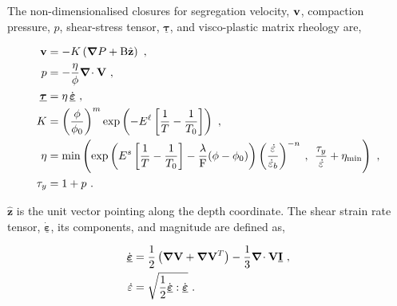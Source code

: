 \documentclass[12pt,a4paper]{article}
\begin{document}
The non-dimensionalised closures for segregation velocity, $\mbox{{\bf v}}$, compaction pressure, $p$, shear-stress tensor, $\underline{\boldsymbol{\tau}}$, and visco-plastic matrix rheology are,
\begin{linenomath*}
\begin{subequations}
\label{eq:nondim-coeffs}
\begin{align}
	\label{eq:nondim-coeffs-segr}
	\mbox{{\bf v}} &= -K \left( \mbox{\boldmath $\nabla$} P + \mathrm{B} \hat{\mathbf{z}} \right) \ , \\
	\label{eq:nondim-coeffs-cpct}
	p &= -\dfrac{\eta}{\phi} \mbox{\boldmath $\nabla$}\!\cdot \mathbf{V} \ , \\
	\label{eq:nondim-coeffs-stress}
	\underline{\boldsymbol{\tau}} &= \eta \, \underline{\dot{\boldsymbol{\varepsilon}}} \ , \\
	\label{eq:nondim-darcy}
	K &= \left(\dfrac{\phi}{\phi_0}\right)^m \exp \left(-E^\ell \left[ \dfrac{1}{T} - \dfrac{1}{T_0} \right] \right) \ , \\
	\label{eq:nondim-coeffs-viscoplast}
	\eta &= \min\left( \exp \left( E^s \left[ \dfrac{1}{T} - \dfrac{1}{T_0} \right] -\dfrac{\lambda} {\mathrm{F}} (\phi-\phi_0) \right) \left(\dfrac{\dot{\varepsilon}}{\dot{\varepsilon}_b} \right)^{-n} \: , \:\: \dfrac{\tau_y}{\dot{\varepsilon}} + \eta_\mathrm{min} \right) \ , \\
	\label{eq:nondim-coeffs-yield}
	\tau_y &= 1 + p \ .
\end{align}
\end{subequations}
\end{linenomath*}
$\hat{\mathbf{z}}$ is the unit vector pointing along the depth coordinate. The shear strain rate tensor, $\underline{\dot{\boldsymbol{\varepsilon}}}$, its components, and magnitude are defined as,
\begin{linenomath*}
\begin{subequations}
\label{eq:nondim-strainr}
\begin{align}
	\label{eq:nondim-strainr-comps}
	\underline{\dot{\boldsymbol{\varepsilon}}} &= \frac{1}{2} \left(\mbox{\boldmath $\nabla$} \mathbf{V} + \mbox{\boldmath $\nabla$} \mathbf{V}^T\right) -\frac{1}{3} \mbox{\boldmath $\nabla$}\!\cdot \mathbf{V} \underline{\mathbf{I}} \ , \\
	\label{eq:nondim-strainr-magn}
	\dot{\varepsilon} &= \sqrt{\dfrac{1}{2} \underline{\dot{\boldsymbol{\varepsilon}}} :  \underline{\dot{\boldsymbol{\varepsilon}}} } \ . 
\end{align}
\end{subequations}
\end{linenomath*}
\end{document}

